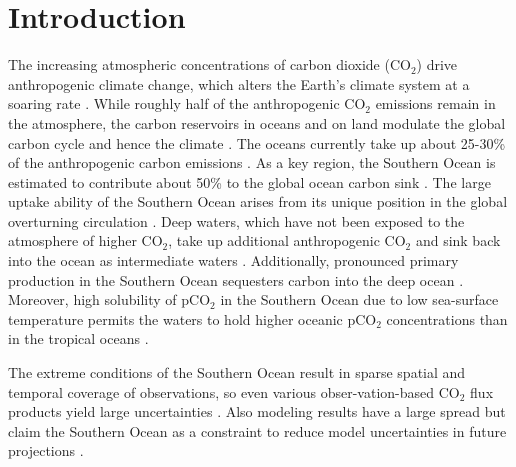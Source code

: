 %
%

%

\chapter{Introduction}\label{ch:introduction}



The increasing atmospheric concentrations of carbon dioxide (CO$_2$) drive anthropogenic climate change, which alters the Earth's climate system at a soaring rate \citep{Crutzen2002}. While roughly half of the anthropogenic CO$_2$ emissions remain in the atmosphere, the carbon reservoirs in oceans and on land modulate the global carbon cycle and hence the climate \citep{Quere2016}. The oceans currently take up about 25-30\% of the anthropogenic carbon emissions \citep{Sabine2004}. As a key region, the Southern Ocean is estimated to contribute about 50\% to the global ocean carbon sink \citep{Takahashi2012}. The large uptake ability of the Southern Ocean arises from its unique position in the global overturning circulation \citep{Talley2013}. Deep waters, which have not been exposed to the atmosphere of higher CO$_2$, take up additional anthropogenic CO$_2$ and sink back into the ocean as intermediate waters \citep{Morrison2015}. Additionally, pronounced primary production in the Southern Ocean sequesters carbon into the deep ocean \citep{Falkowski1998}. Moreover, high solubility of pCO$_2$ in the Southern Ocean due to low sea-surface temperature permits the waters to hold higher oceanic pCO$_2$ concentrations than in the tropical oceans \citep{Heinze2015}.\newline %
 
The extreme conditions of the Southern Ocean result in sparse spatial and temporal coverage of observations, so even various obser-vation-based CO$_2$ flux products yield large uncertainties \citep{Roedenbeck2015}. Also modeling results have a large spread \citep{Wang2016} but claim the Southern Ocean as a constraint to reduce model uncertainties in future projections \citep{Kessler2016}.

